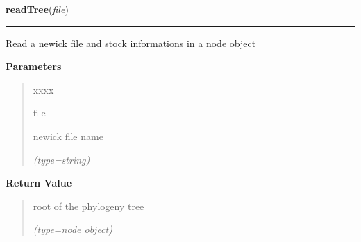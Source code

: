     \label{script-phyloFixedVar:readTree}

    \vspace{0.5ex}

\hspace{.8\funcindent}\begin{boxedminipage}{\funcwidth}

    \raggedright \textbf{readTree}(\textit{file})

    \vspace{-1.5ex}

    \rule{\textwidth}{0.5\fboxrule}
\setlength{\parskip}{2ex}
    Read a newick file and stock informations in a node object

\setlength{\parskip}{1ex}
      \textbf{Parameters}
      \vspace{-1ex}

      \begin{quote}
        \begin{Ventry}{xxxx}

          \item[file]

          newick file name

            {\it (type=string)}

        \end{Ventry}

      \end{quote}

      \textbf{Return Value}
    \vspace{-1ex}

      \begin{quote}
      root of the phylogeny tree

      {\it (type=node object)}

      \end{quote}

    \end{boxedminipage}

    \label{script-phyloFixedVar:allNodesLeafs}

    \vspace{0.5ex}

